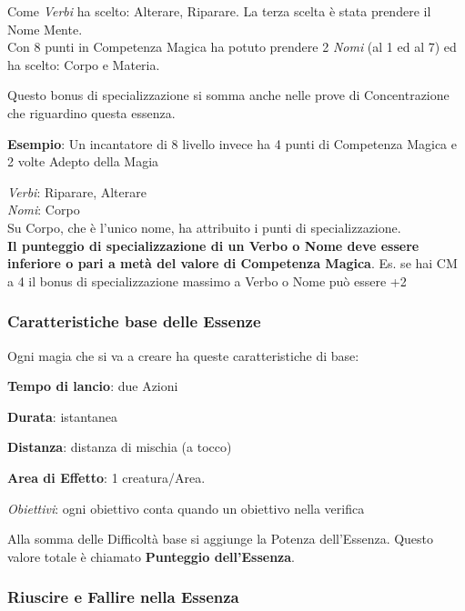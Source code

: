 \documentclass[a4paper,twoside,openany]{book}
\begin{document}
\begin{multicols}{2}
Come \textit{Verbi} ha scelto: Alterare, Riparare. La terza scelta è stata prendere il Nome Mente.\\

Con 8 punti in Competenza Magica ha potuto prendere 2 \textit{Nomi} (al 1 ed al 7) ed ha scelto: Corpo e Materia.

Questo bonus di specializzazione si somma anche nelle prove di Concentrazione che riguardino questa essenza.

\textbf{Esempio}: Un incantatore di 8 livello invece ha 4 punti di Competenza Magica e 2 volte Adepto della Magia

\textit{Verbi}: Riparare, Alterare\\
\textit{Nomi}: Corpo\\
Su Corpo, che è l'unico nome, ha attribuito i punti di specializzazione.\\

\textbf{Il punteggio di specializzazione di un Verbo o Nome deve essere inferiore o pari a metà del valore di Competenza Magica}. Es. se hai CM a 4 il bonus di specializzazione massimo a Verbo o Nome può essere +2

\subsubsection{Caratteristiche base delle Essenze}

\label{caratteristiche-base-delle-essenze}

Ogni magia che si va a creare ha queste caratteristiche di base:

\smallskip

\textbf{Tempo di lancio}: due Azioni

\textbf{Durata}: istantanea

\textbf{Distanza}: distanza di mischia (a tocco)

\textbf{Area di Effetto}: 1 creatura/Area.

\textit{Obiettivi}: ogni obiettivo conta quando un obiettivo nella verifica

Alla somma delle Difficoltà base si aggiunge la Potenza dell'Essenza. Questo valore totale è chiamato \textbf{Punteggio dell'Essenza}.

\subsubsection{Riuscire e Fallire nella Essenza}


\end{multicols}
\end{document}

